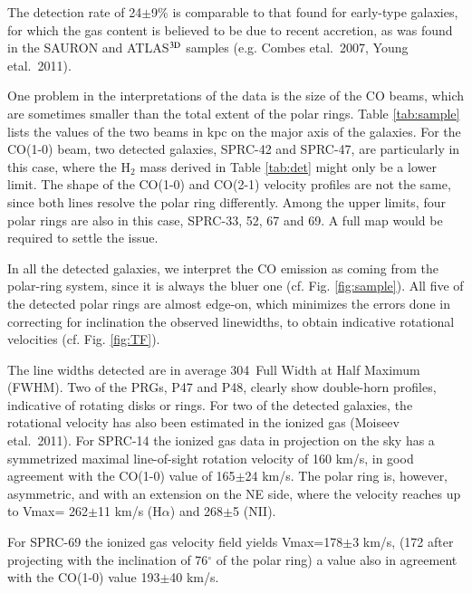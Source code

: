 \documentclass[traditabstract]{aa}
\def\ts     {\thinspace}
\def\kms    {\ifmmode{{\rm \ts km\ts s}^{-1}}\else{\ts km\ts s$^{-1}$}\fi}
\def\etal   {{\rm et\ts al.}~}
\begin{document}
The detection rate of 24$\pm$9\% is comparable to that found for early-type galaxies,
for which the gas content is believed to be due to recent accretion,
as was found in the SAURON and ATLAS$^{\rm 3D}$ samples (e.g. Combes \etal 2007, 
Young \etal 2011).

One problem in the interpretations of the data is the size of the CO beams, 
which are sometimes smaller than the total extent of the polar rings.
Table \ref{tab:sample} lists the values of the two beams in kpc
on the major axis of the galaxies.
For the CO(1-0) beam, two detected galaxies, SPRC-42 and SPRC-47, 
are particularly in this case,
where the H$_2$ mass derived in Table \ref{tab:det} might 
only be a lower limit. The shape of the CO(1-0) and CO(2-1) velocity profiles are not the
same, since both lines resolve the polar ring differently.
Among the upper limits, four polar rings are also in this case,
SPRC-33, 52, 67 and 69. A full map would be required to settle the issue. 

In all the detected galaxies, we interpret the CO emission as coming from
the polar-ring system, since it is always the bluer one (cf. Fig. \ref{fig:sample}).
 All five of the detected polar rings are almost edge-on, 
which minimizes the errors done in correcting for inclination
the observed linewidths, to obtain indicative 
rotational velocities (cf. Fig. \ref{fig:TF}).

  The line widths detected are in average 304\kms\, Full Width at Half Maximum (FWHM). Two of the PRGs, P47 and P48,
 clearly show double-horn profiles, indicative of rotating disks or rings. 
For two of the detected galaxies, the rotational velocity has also been estimated  
in the ionized gas (Moiseev \etal 2011). 
For SPRC-14 the ionized gas data in projection on the sky has a
symmetrized maximal line-of-sight rotation velocity of 
160 km/s, in good
agreement with the CO(1-0) value of 165$\pm$24 km/s.
The polar ring is, however, asymmetric, and with an extension on the NE side,
where the velocity reaches up to 
Vmax= 262$\pm$11 km/s (H$\alpha$) and  268$\pm$5 (NII).  

For SPRC-69 the ionized gas velocity field yields
Vmax=178$\pm$3 km/s, (172 after projecting with the inclination 
of 76$^\circ$ of the polar ring)
a value also in agreement with the CO(1-0) value 193$\pm$40 km/s.
\end{document}
